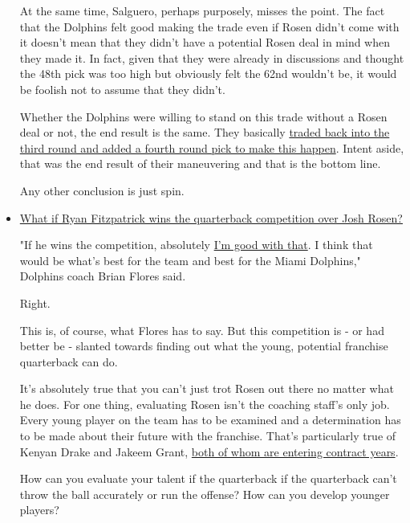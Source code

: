 \documentclass[11pt]{article}
\begin{document}
\begin{itemize}
At the same time, Salguero, perhaps purposely, misses the point.  The fact that the Dolphins felt good making the trade even if Rosen didn't come with it doesn't mean that they didn't have a potential Rosen deal in mind when they made it.  In fact, given that they were already in discussions and thought the 48th pick was too high but obviously felt the 62nd wouldn't be, it would be foolish not to assume that they didn't.

Whether the Dolphins were willing to stand on this trade without a Rosen deal or not, the end result is the same.  They basically \href{https://www.phinmaniacs.com/news/miami-dolphins-post-draft-points-of-view}{traded back into the third round and added a fourth round pick to make this happen}.  Intent aside, that was the end result of their maneuvering and that is the bottom line.

Any other conclusion is just spin.

\item \href{https://www.phinmaniacs.com/news/its-okay-to-change-your-mind-about-dolphins-qb-josh-rosen}{What if Ryan Fitzpatrick wins the quarterback competition over Josh Rosen?}

"If he wins the competition, absolutely \href{https://www.sun-sentinel.com/sports/miami-dolphins/fl-sp-dolphins-qb-competition-20190510-dj3du7vsznaddn36ju64poo73m-story.html}{I’m good with that}. I think that would be what’s best for the team and best for the Miami Dolphins," Dolphins coach Brian Flores said.

Right.

This is, of course, what Flores has to say.  But this competition is - or had better be - slanted towards finding out what the young, potential franchise quarterback can do.  

It's absolutely true that you can't just trot Rosen out there no matter what he does.  For one thing, evaluating Rosen isn't the coaching staff's only job.  Every young player on the team has to be examined and a determination has to be made about their future with the franchise.  That's particularly true of Kenyan Drake and Jakeem Grant, \href{https://www.sun-sentinel.com/sports/miami-dolphins/fl-sp-dolphins-xavien-howard-20190510-nmebckxrcnfnpfp2pamje77aeu-story.html}{both of whom are entering contract years}.

How can you evaluate your talent if the quarterback if the quarterback can't throw the ball accurately or run the offense?  How can you develop younger players?


\end{itemize}
\end{document}

